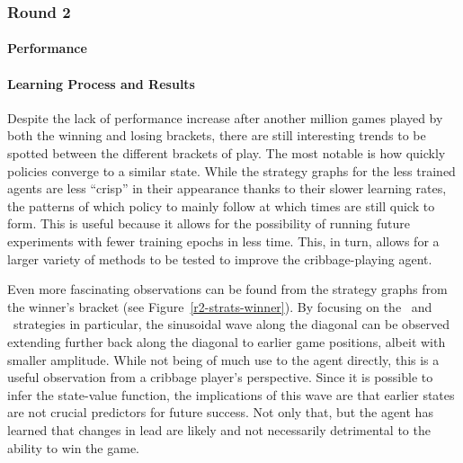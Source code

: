 
\subsubsection{Round 2}
\label{sec:findings-r2}

\paragraph*{Performance}
\label{sec:findings-r2-perf}








\paragraph*{Learning Process and Results}
\label{sec:findings-r2-results}




Despite the lack of performance increase after another million games played by
both the winning and losing brackets,
there are still interesting trends to be spotted between the different brackets
of play.
%
The most notable is how quickly policies converge to a similar state.
%
While the strategy graphs for the less trained agents are less ``crisp''
in their appearance thanks to their slower learning rates,
the patterns of which policy to mainly follow at which times
are still quick to form.
%
This is useful because it allows for the possibility of running future
experiments with fewer training epochs in less time.
%
This, in turn, allows for a larger variety of methods to be tested to improve
the cribbage-playing agent.

Even more fascinating observations can be found from the strategy graphs
from the winner's bracket (see Figure~\ref{r2-strats-winner}).
%
By focusing on the \handmaxmin\ and \handmaxavg\ strategies in particular,
the sinusoidal wave along the diagonal can be observed extending further
back along the diagonal to earlier game positions,
albeit with smaller amplitude.
%
While not being of much use to the agent directly,
this is a useful observation from a cribbage player's perspective.
%
Since it is possible to infer the state-value function,
the implications of this wave are that earlier states are not crucial
predictors for future success.
%
Not only that,
but the agent has learned that changes in lead are likely and not necessarily
detrimental to the ability to win the game.

